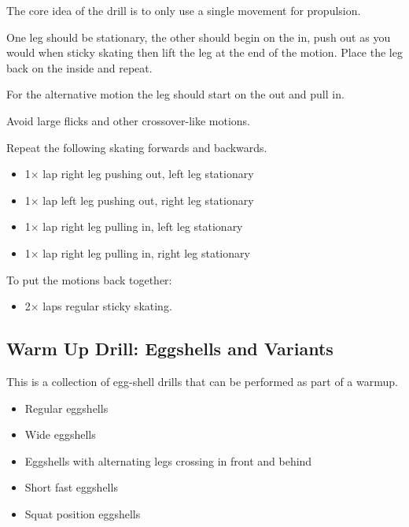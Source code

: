 The core idea of the drill is to only use a single movement for propulsion.  

One leg should be stationary, the other should begin on the in, push out as you would when sticky skating then lift the leg at the end of the motion.  
Place the leg back on the inside and repeat. 

For the alternative motion the leg should start on the out and pull in.   

Avoid large flicks and other crossover-like motions.    

Repeat the following skating forwards and backwards. 
\begin{itemize}
    \item 1$\times$ lap right leg pushing out, left leg stationary  
    \item 1$\times$ lap left leg pushing out, right leg stationary 
    \item 1$\times$ lap right leg pulling in, left leg stationary 
    \item 1$\times$ lap right leg pulling in, right leg stationary 
\end{itemize}

To put the motions back together:
\begin{itemize}
    \item 2$\times$ laps regular sticky skating. 
\end{itemize}


\subsection*{Warm Up Drill: Eggshells and Variants}

This is a collection of egg-shell drills that can be performed as part of a warmup. 

\begin{itemize}
    \item Regular eggshells  
    \item Wide eggshells
    \item Eggshells with alternating legs crossing in front and behind 
    \item Short fast eggshells 
    \item Squat position eggshells
\end{itemize}
